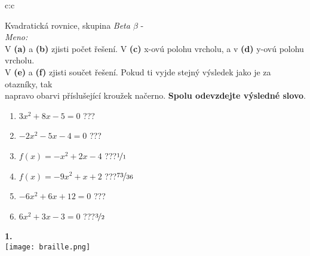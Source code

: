 \documentclass[10pt]{report}
\begin{document}
\clearpage
\thispagestyle{empty}
\begin{tabular}{c:c}
\begin{minipage}[c][99mm][t]{0.49\linewidth}
\begin{center}
\vspace{7mm}
{\huge Kvadratická rovnice, skupina \textit{Beta $\beta$} -}\\[4.5mm]
\textit{Meno:}\phantom{xxxxxxxxxxxxxxxxxxxxxxxxxxxxxxxxxxxxxxxxxxxxxxxxxxxxxxxxxxxxxxxxx}\\[3.5mm]
V \textbf{(a)} a \textbf{(b)} zjisti počet řešení. V \textbf{(c)} x-ovú polohu vrcholu, a v \textbf{(d)} y-ovú polohu vrcholu.\\V \textbf{(e)} a \textbf{(f)} zjisti součet řešení. Pokud ti vyjde stejný výsledek jako je za otazníky, tak\\napravo obarvi příslušející kroužek načerno. \textbf{Spolu odevzdejte výsledné slovo}.\\[3mm]
\begin{minipage}{0.77\linewidth}
\begin{center}
\begin{varwidth}{\textwidth}
\begin{enumerate}
\large
\item $3x^2+8x-5=0$\quad \dotfill\; ???\;\dotfill {}
\item $-2x^2-5x-4=0$\quad \dotfill\; ???\;\dotfill {}
\item $f(x)=-x^2+2x-4$\quad \dotfill\; ???\;\dotfill \quad $\nicefrac{1}{1}$
\item $f(x)=-9x^2+x+2$\quad \dotfill\; ???\;\dotfill \quad $\nicefrac{73}{36}$
\item $-6x^2+6x+12=0$\quad \dotfill\; ???\;\dotfill {}
\item $6x^2+3x-3=0$\quad \dotfill\; ???\;\dotfill \quad $\nicefrac{3}{2}$
\end{enumerate}
\end{varwidth}
\end{center}
\end{minipage}
\begin{minipage}{0.20\linewidth}
\begin{center}
{\Huge\bfseries 1.} \\[2mm]
\texttt{[image: braille.png]}

\end{center}
\end{minipage}
\end{center}
\end{minipage}
\end{tabular}
\end{document}
